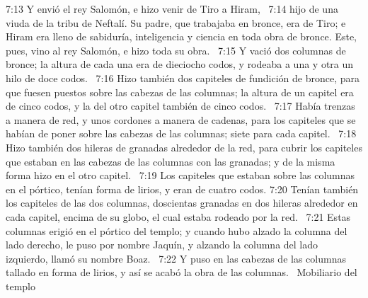 7:13 Y envió el rey Salomón, e hizo venir de Tiro a Hiram,  
7:14 hijo de una viuda de la tribu de Neftalí. Su padre, que trabajaba en bronce, era de Tiro; e Hiram era lleno de sabiduría, inteligencia y ciencia en toda obra de bronce. Este, pues, vino al rey Salomón, e hizo toda su obra.  
7:15 Y vació dos columnas de bronce; la altura de cada una era de dieciocho codos, y rodeaba a una y otra un hilo de doce codos.  
7:16 Hizo también dos capiteles de fundición de bronce, para que fuesen puestos sobre las cabezas de las columnas; la altura de un capitel era de cinco codos, y la del otro capitel también de cinco codos.  
7:17 Había trenzas a manera de red, y unos cordones a manera de cadenas, para los capiteles que se habían de poner sobre las cabezas de las columnas; siete para cada capitel.  
7:18 Hizo también dos hileras de granadas alrededor de la red, para cubrir los capiteles que estaban en las cabezas de las columnas con las granadas; y de la misma forma hizo en el otro capitel.  
7:19 Los capiteles que estaban sobre las columnas en el pórtico, tenían forma de lirios, y eran de cuatro codos. 
7:20 Tenían también los capiteles de las dos columnas, doscientas granadas en dos hileras alrededor en cada capitel, encima de su globo, el cual estaba rodeado por la red.  
7:21 Estas columnas erigió en el pórtico del templo; y cuando hubo alzado la columna del lado derecho, le puso por nombre Jaquín, y alzando la columna del lado izquierdo, llamó su nombre Boaz.  
7:22 Y puso en las cabezas de las columnas tallado en forma de lirios, y así se acabó la obra de las columnas.  
Mobiliario del templo  

